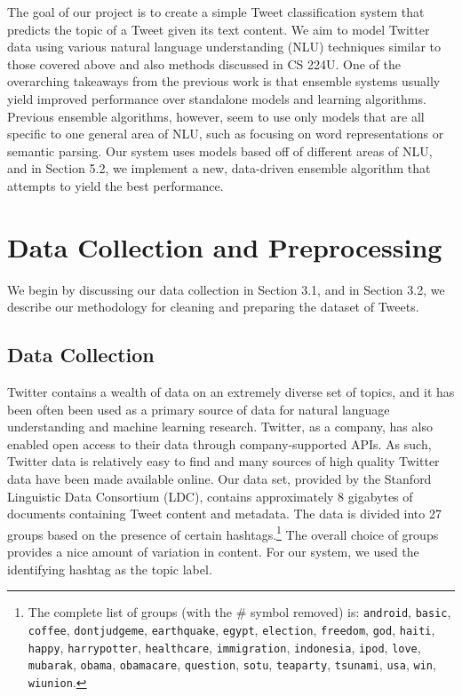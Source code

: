 \documentclass[11pt]{article}
\begin{document}
The goal of our project is to create a simple Tweet classification system that predicts the topic of a Tweet given its text content. We aim to model Twitter data using various natural language understanding (NLU) techniques similar to those covered above and also methods discussed in CS 224U.  One of the overarching takeaways from the previous work is that ensemble systems usually yield improved performance over standalone models and learning algorithms. Previous ensemble algorithms, however, seem to use only models that are all specific to one general area of NLU, such as focusing on word representations or semantic parsing. Our system uses models based off of different areas of NLU, and in Section 5.2, we implement a new, data-driven ensemble algorithm that attempts to yield the best performance.

\section{Data Collection and Preprocessing}

We begin by discussing our data collection in Section 3.1, and in Section 3.2, we describe our methodology for cleaning and preparing the dataset of Tweets.

\subsection{Data Collection}
Twitter contains a wealth of data on an extremely diverse set of topics, and it has been often been used as a primary source of data for natural language understanding and machine learning research. Twitter, as a company, has also enabled open access to their data through company-supported APIs. As such, Twitter data is relatively easy to find and many sources of high quality Twitter data have been made available online. Our data set, provided by the Stanford Linguistic Data Consortium (LDC), contains approximately 8 gigabytes of documents containing Tweet content and metadata. The data is divided into 27 groups based on the presence of certain hashtags.\footnote{The complete list of groups (with the \# symbol removed) is: \texttt{android}, \texttt{basic}, \texttt{coffee}, \texttt{dontjudgeme}, \texttt{earthquake}, \texttt{egypt}, \texttt{election}, \texttt{freedom}, \texttt{god}, \texttt{haiti}, \texttt{happy}, \texttt{harrypotter}, \texttt{healthcare}, \texttt{immigration}, \texttt{indonesia}, \texttt{ipod}, \texttt{love}, \texttt{mubarak}, \texttt{obama}, \texttt{obamacare}, \texttt{question}, \texttt{sotu}, \texttt{teaparty}, \texttt{tsunami}, \texttt{usa}, \texttt{win}, \texttt{wiunion}.} The overall choice of groups provides a nice amount of variation in content. For our system, we used the identifying hashtag as the topic label.
\end{document}
